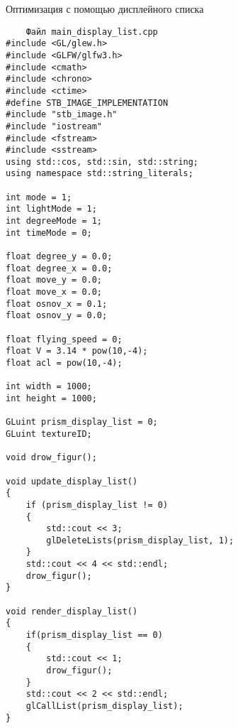 \documentclass[a4paper, 14pt]{extarticle}
\begin{document}
\begin{center}
\Large {Оптимизация с помощью дисплейного списка} \\ 
\end{center}\normalsize

\begin{verbatim}
    Файл main_display_list.cpp
#include <GL/glew.h>
#include <GLFW/glfw3.h>
#include <cmath>
#include <chrono>
#include <ctime>
#define STB_IMAGE_IMPLEMENTATION
#include "stb_image.h"
#include "iostream"
#include <fstream>
#include <sstream>
using std::cos, std::sin, std::string;
using namespace std::string_literals;

int mode = 1;
int lightMode = 1;
int degreeMode = 1;
int timeMode = 0;

float degree_y = 0.0;   
float degree_x = 0.0;
float move_y = 0.0;
float move_x = 0.0;
float osnov_x = 0.1;
float osnov_y = 0.0;

float flying_speed = 0;
float V = 3.14 * pow(10,-4);
float acl = pow(10,-4);

int width = 1000;
int height = 1000;

GLuint prism_display_list = 0;
GLuint textureID;

void drow_figur();

void update_display_list()
{
    if (prism_display_list != 0)
    {
        std::cout << 3;
        glDeleteLists(prism_display_list, 1);
    }
    std::cout << 4 << std::endl;
    drow_figur();
}

void render_display_list()
{
    if(prism_display_list == 0)
    {
        std::cout << 1;
        drow_figur();
    }
    std::cout << 2 << std::endl;
    glCallList(prism_display_list);
}


\end{verbatim}
\end{document}
